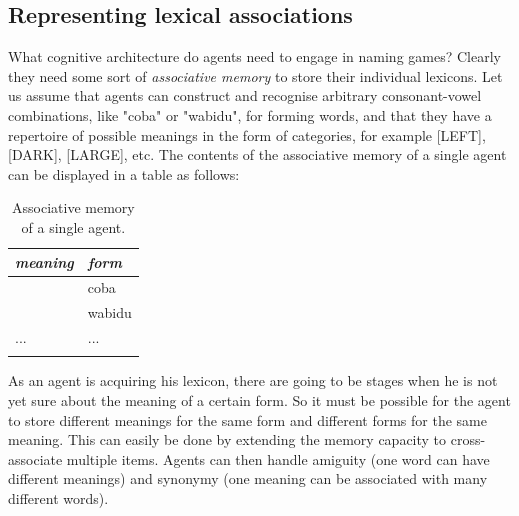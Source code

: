 \subsection{Representing lexical associations}

What cognitive architecture do agents need to engage in naming 
games? Clearly they need some sort of {\it associative memory} to
store their individual lexicons.
Let us assume that agents 
can construct and recognise arbitrary consonant-vowel combinations, 
like "coba" or "wabidu", for forming words, and that they 
have a repertoire of possible meanings in the form of 
categories, for example [LEFT], [DARK], [LARGE], etc. 
The contents of the associative memory of a single agent can
be displayed in a table as follows: 
\begin{table}
\begin{center}
\begin{tabular}{ l  l }
\lsptoprule
{\it meaning} & {\it form} \\ \midrule
[DARK] & coba \\ \midrule
[LARGE] & wabidu \\ \midrule
... & ... \\ \midrule
\lspbottomrule
\end{tabular}
\end{center}
\caption{\label{tab:t-mem} Associative memory of a single agent.}
\end{table}
As an agent is acquiring his lexicon, there are going to 
be stages when he is not yet sure about the meaning of 
a certain form. So it must be possible for the agent
to store different 
meanings for the same form and different forms for the
same meaning. This can easily be done by extending the memory capacity
to cross-associate multiple items. Agents can then 
handle amiguity (one word can have different
meanings) and synonymy (one meaning can 
be associated with many different words). 

